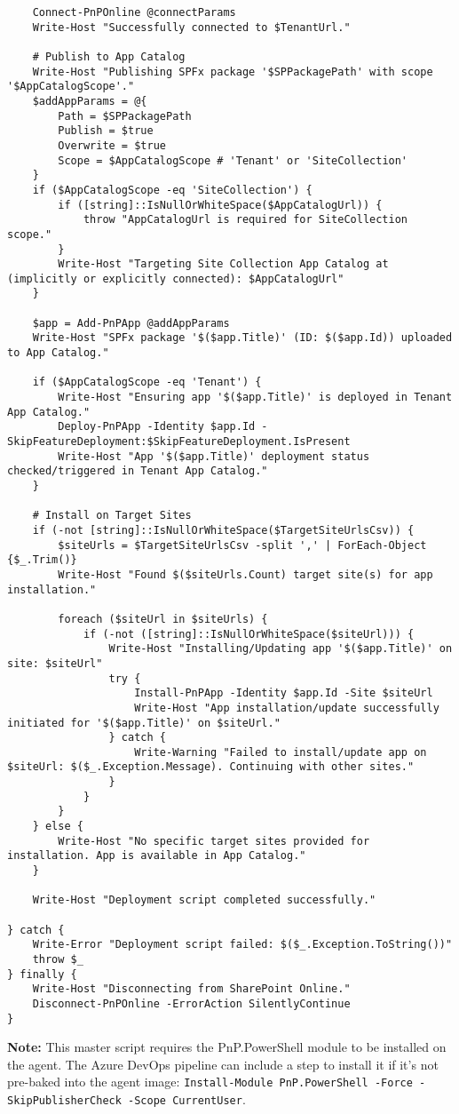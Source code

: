 \begin{verbatim}
    Connect-PnPOnline @connectParams
    Write-Host "Successfully connected to $TenantUrl."

    # Publish to App Catalog
    Write-Host "Publishing SPFx package '$SPPackagePath' with scope '$AppCatalogScope'."
    $addAppParams = @{
        Path = $SPPackagePath
        Publish = $true
        Overwrite = $true
        Scope = $AppCatalogScope # 'Tenant' or 'SiteCollection'
    }
    if ($AppCatalogScope -eq 'SiteCollection') {
        if ([string]::IsNullOrWhiteSpace($AppCatalogUrl)) {
            throw "AppCatalogUrl is required for SiteCollection scope."
        }
        Write-Host "Targeting Site Collection App Catalog at (implicitly or explicitly connected): $AppCatalogUrl"
    }

    $app = Add-PnPApp @addAppParams
    Write-Host "SPFx package '$($app.Title)' (ID: $($app.Id)) uploaded to App Catalog."

    if ($AppCatalogScope -eq 'Tenant') {
        Write-Host "Ensuring app '$($app.Title)' is deployed in Tenant App Catalog."
        Deploy-PnPApp -Identity $app.Id -SkipFeatureDeployment:$SkipFeatureDeployment.IsPresent
        Write-Host "App '$($app.Title)' deployment status checked/triggered in Tenant App Catalog."
    }

    # Install on Target Sites
    if (-not [string]::IsNullOrWhiteSpace($TargetSiteUrlsCsv)) {
        $siteUrls = $TargetSiteUrlsCsv -split ',' | ForEach-Object {$_.Trim()}
        Write-Host "Found $($siteUrls.Count) target site(s) for app installation."

        foreach ($siteUrl in $siteUrls) {
            if (-not ([string]::IsNullOrWhiteSpace($siteUrl))) {
                Write-Host "Installing/Updating app '$($app.Title)' on site: $siteUrl"
                try {
                    Install-PnPApp -Identity $app.Id -Site $siteUrl
                    Write-Host "App installation/update successfully initiated for '$($app.Title)' on $siteUrl."
                } catch {
                    Write-Warning "Failed to install/update app on $siteUrl: $($_.Exception.Message). Continuing with other sites."
                }
            }
        }
    } else {
        Write-Host "No specific target sites provided for installation. App is available in App Catalog."
    }

    Write-Host "Deployment script completed successfully."

} catch {
    Write-Error "Deployment script failed: $($_.Exception.ToString())"
    throw $_ 
} finally {
    Write-Host "Disconnecting from SharePoint Online."
    Disconnect-PnPOnline -ErrorAction SilentlyContinue
}
\end{verbatim}
\textbf{Note:} This master script requires the PnP.PowerShell module to be installed on the agent. The Azure DevOps pipeline can include a step to install it if it's not pre-baked into the agent image: \texttt{Install-Module PnP.PowerShell -Force -SkipPublisherCheck -Scope CurrentUser}.
